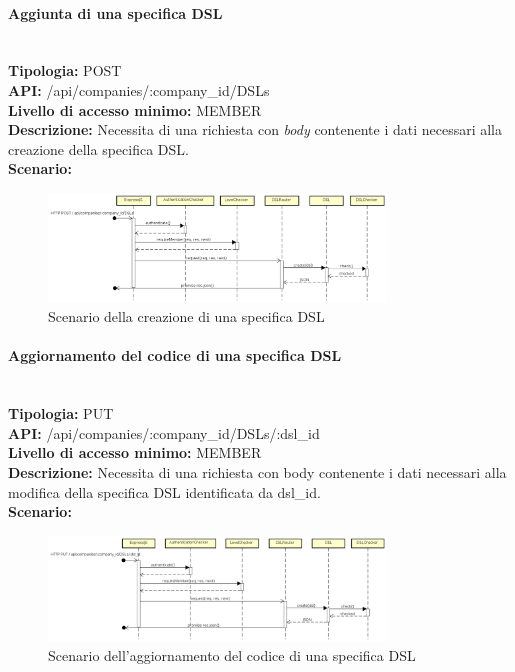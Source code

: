 \newpage
\paragraph{Aggiunta di una specifica DSL}\mbox{}\\
\textbf{Tipologia:} POST \\
\textbf{API:} /api/companies/:company\_id/DSLs \\
\textbf{Livello di accesso minimo:} MEMBER \\
\textbf{Descrizione:} Necessita di una richiesta con \textit{body} contenente i dati necessari alla creazione della specifica DSL. \\
\textbf{Scenario:} 
\begin{figure}[H]
\centering
\includegraphics[width=0.8\textwidth]{res/sections/backend/sequence/(POST)dsl.png}
\caption{Scenario della creazione di una specifica DSL}
\end{figure}

\newpage
\paragraph{Aggiornamento del codice di una specifica DSL}\mbox{}\\
\textbf{Tipologia:} PUT \\
\textbf{API:} /api/companies/:company\_id/DSLs/:dsl\_id \\
\textbf{Livello di accesso minimo:} MEMBER \\
\textbf{Descrizione:} Necessita di una richiesta con body contenente i dati necessari alla modifica della specifica DSL identificata da dsl\_id. \\
\textbf{Scenario:}
\begin{figure}[H]
\centering
\includegraphics[width=0.8\textwidth]{res/sections/backend/sequence/(PUT)dsl.png}
\caption{Scenario dell'aggiornamento del codice di una specifica DSL}
\end{figure}

